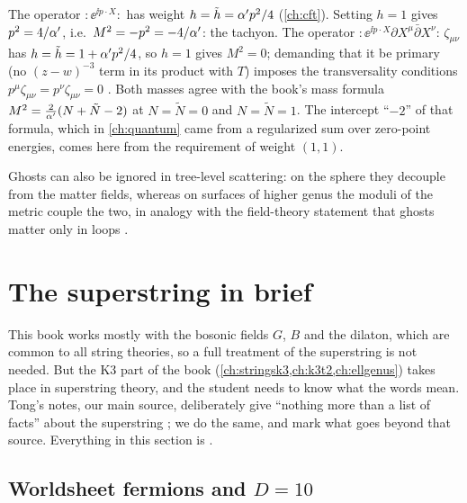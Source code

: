 \begin{example}\label{ex:ghosts:masses}
The operator ${:}\ee^{\ii p\cdot X}{:}$ has weight $h=\tilde h=\alpha' p^2/4$ (\cref{ch:cft}).
Setting $h=1$ gives $p^2=4/\alpha'$, i.e.\ $M^2=-p^2=-4/\alpha'$: the tachyon. The operator
${:}\ee^{\ii p\cdot X}\partial X^\mu\bar\partial X^\nu{:}\,\zeta_{\mu\nu}$ has
$h=\tilde h=1+\alpha' p^2/4$, so $h=1$ gives $M^2=0$; demanding that it be primary (no
$(z-w)^{-3}$ term in its product with $T$) imposes the transversality conditions
$p^\mu\zeta_{\mu\nu}=p^\nu\zeta_{\mu\nu}=0$ . Both
masses agree with the book's mass formula $M^2=\frac{2}{\alpha'}(N+\tilde N-2)$ at
$N=\tilde N=0$ and $N=\tilde N=1$. The intercept ``$-2$'' of that formula, which in
\cref{ch:quantum} came from a regularized sum over zero-point energies, comes here from the
requirement of weight $(1,1)$.
\end{example}

Ghosts can also be ignored in tree-level scattering: on the sphere they decouple from the
matter fields, whereas on surfaces of higher genus the moduli of the metric couple the two,
in analogy with the field-theory statement that ghosts matter only in loops
.

\section{The superstring in brief}\label{sec:ghosts:super}

This book works mostly with the bosonic fields $G$, $B$ and the dilaton, which are common to
all string theories, so a full treatment of the superstring is not needed. But the K3 part of
the book (\cref{ch:stringsk3,ch:k3t2,ch:ellgenus}) takes place in superstring theory, and
the student needs to know what the words mean. Tong's notes, our main source, deliberately
give ``nothing more than a list of facts'' about the superstring
; we do the same, and mark what goes beyond that source.
Everything in this section is \TL.

\subsection{Worldsheet fermions and \texorpdfstring{$D=10$}{D = 10}}

